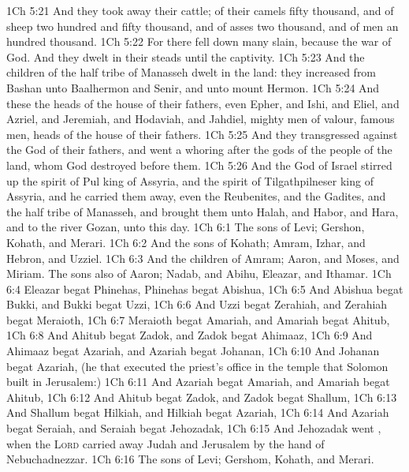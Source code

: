 \vs 1Ch 5:21 And they took away their cattle; of their camels fifty thousand, and of sheep two hundred and fifty thousand, and of asses two thousand, and of men an hundred thousand.
\vs 1Ch 5:22 For there fell down many slain, because the war  of God. And they dwelt in their steads until the captivity.
\vs 1Ch 5:23 And the children of the half tribe of Manasseh dwelt in the land: they increased from Bashan unto Baalhermon and Senir, and unto mount Hermon.
\vs 1Ch 5:24 And these  the heads of the house of their fathers, even Epher, and Ishi, and Eliel, and Azriel, and Jeremiah, and Hodaviah, and Jahdiel, mighty men of valour, famous men,  heads of the house of their fathers.
\vs 1Ch 5:25 And they transgressed against the God of their fathers, and went a whoring after the gods of the people of the land, whom God destroyed before them.
\vs 1Ch 5:26 And the God of Israel stirred up the spirit of Pul king of Assyria, and the spirit of Tilgathpilneser king of Assyria, and he carried them away, even the Reubenites, and the Gadites, and the half tribe of Manasseh, and brought them unto Halah, and Habor, and Hara, and to the river Gozan, unto this day.
\vs 1Ch 6:1 The sons of Levi; Gershon, Kohath, and Merari.
\vs 1Ch 6:2 And the sons of Kohath; Amram, Izhar, and Hebron, and Uzziel.
\vs 1Ch 6:3 And the children of Amram; Aaron, and Moses, and Miriam. The sons also of Aaron; Nadab, and Abihu, Eleazar, and Ithamar.
\vs 1Ch 6:4 Eleazar begat Phinehas, Phinehas begat Abishua,
\vs 1Ch 6:5 And Abishua begat Bukki, and Bukki begat Uzzi,
\vs 1Ch 6:6 And Uzzi begat Zerahiah, and Zerahiah begat Meraioth,
\vs 1Ch 6:7 Meraioth begat Amariah, and Amariah begat Ahitub,
\vs 1Ch 6:8 And Ahitub begat Zadok, and Zadok begat Ahimaaz,
\vs 1Ch 6:9 And Ahimaaz begat Azariah, and Azariah begat Johanan,
\vs 1Ch 6:10 And Johanan begat Azariah, (he  that executed the priest's office in the temple that Solomon built in Jerusalem:)
\vs 1Ch 6:11 And Azariah begat Amariah, and Amariah begat Ahitub,
\vs 1Ch 6:12 And Ahitub begat Zadok, and Zadok begat Shallum,
\vs 1Ch 6:13 And Shallum begat Hilkiah, and Hilkiah begat Azariah,
\vs 1Ch 6:14 And Azariah begat Seraiah, and Seraiah begat Jehozadak,
\vs 1Ch 6:15 And Jehozadak went , when the \textsc{Lord} carried away Judah and Jerusalem by the hand of Nebuchadnezzar.
\vs 1Ch 6:16 The sons of Levi; Gershom, Kohath, and Merari.
